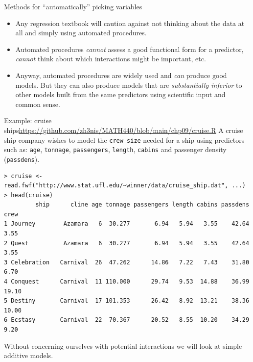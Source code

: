 \documentclass{beamer}
\begin{document}
\begin{frame}{Methods for ``automatically'' picking variables}
\begin{itemize}
\item Any regression textbook will caution against not thinking
about the data at all and simply using automated procedures.
\item\pause Automated procedures \textit{cannot} assess a good functional form for a predictor, \textit{cannot} think about which interactions might be important, etc.
\item\pause Anyway, automated procedures are widely used and \textit{can} produce good models. \pause But they can also produce models that are \textit{substantially inferior} to other models built from the same predictors using scientific input and common sense.
\end{itemize}
\end{frame}

\begin{frame}[fragile]{Example: cruise ships}{\url{https://github.com/zh3nis/MATH440/blob/main/chp09/cruise.R}}
A cruise ship company wishes to model the \texttt{crew size} needed for a ship using predictors such as: \texttt{age}, \texttt{tonnage}, \texttt{passengers}, \texttt{length}, \texttt{cabins} and passenger density (\texttt{passdens}). 

\pause
\begin{tiny}
\begin{verbatim}
> cruise <- read.fwf("http://www.stat.ufl.edu/~winner/data/cruise_ship.dat", ...)
> head(cruise)
         ship      cline age tonnage passengers length cabins passdens  crew
1 Journey        Azamara   6  30.277       6.94   5.94   3.55    42.64  3.55
2 Quest          Azamara   6  30.277       6.94   5.94   3.55    42.64  3.55
3 Celebration   Carnival  26  47.262      14.86   7.22   7.43    31.80  6.70
4 Conquest      Carnival  11 110.000      29.74   9.53  14.88    36.99 19.10
5 Destiny       Carnival  17 101.353      26.42   8.92  13.21    38.36 10.00
6 Ecstasy       Carnival  22  70.367      20.52   8.55  10.20    34.29  9.20
\end{verbatim}
\end{tiny}

\pause Without concerning ourselves with potential interactions we will look at simple additive models.
\end{frame}
\end{document}
